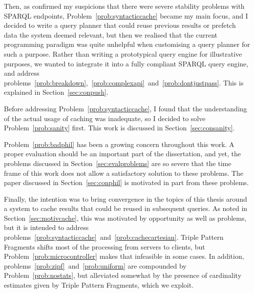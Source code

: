 Then, as \cite{buil2013sparql} confirmed my suspicions that there were
severe stability problems with SPARQL endpoints,
Problem~\ref{prob:syntacticcache} became my main focus, and I decided
to write a query planner that could reuse previous results or prefetch
data the system deemed relevant, but then we realised that the current
programming paradigm was quite unhelpful when customising a query
planner for such a purpose. Rather than writing a prototypical query
engine for illustrative purposes, we wanted to integrate it into a
fully compliant SPARQL query engine, and address
problems~\ref{prob:breakdown},~\ref{prob:complexapi}~and~\ref{prob:dontjustpass}. This
is explained in Section~\ref{sec:conpush}.


Before addressing Problem~\ref{prob:syntacticcache}, I found that the
understanding of the actual usage of caching was inadequate, so I
decided to solve Problem~\ref{prob:sanity} first. This work is
discussed in Section~\ref{sec:consanity}.

Problem~\ref{prob:badphil} has been a growing concern throughout this
work. A proper evaluation should be an important part of the
dissertation, and yet, the problems discussed in
Section~\ref{sec:evalproblems} are so severe that the time frame of
this work does not allow a satisfactory solution to these
problems. The paper discussed in Section~\ref{sec:conphil} is
motivated in part from these problems.

Finally, the intention was to bring convergence in the topics of this
thesis around a system to cache results that could be reused in
subsequent queries. As noted in Section~\ref{sec:motivcache}, this was
motivated by opportunity as well as problems, but it is intended to
address
problems~\ref{prob:syntacticcache}~and~\ref{prob:cachecartesian}.
Triple Pattern Fragments shifts most of the processing from servers to
clients, but Problem~\ref{prob:microcontroller} makes that infeasible
in some cases.  In addition,
problems~\ref{prob:zipf}~and~\ref{prob:uniform} are compounded by
Problem~\ref{prob:nostats}, but alleviated somewhat by the presence of
cardinality estimates given by Triple Pattern Fragments, which we
exploit.


